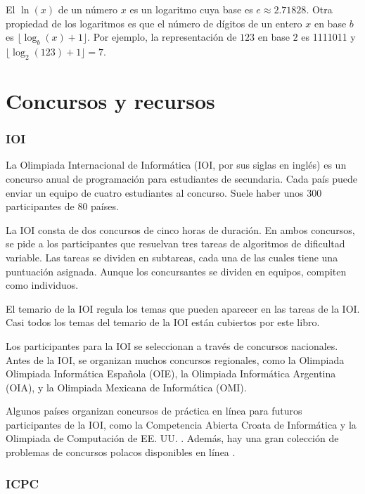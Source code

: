 El  $\ln(x)$ de un número $x$
es un logaritmo cuya base es $e \approx 2.71828$.
Otra propiedad de los logaritmos es que
el número de dígitos de un entero $x$ en base $b$ es
$\lfloor \log_b(x)+1 \rfloor$.
Por ejemplo, la representación de
$123$ en base $2$ es 1111011 y
$\lfloor \log_2(123)+1 \rfloor = 7$.

\section{Concursos y recursos}

\subsubsection{IOI}

La Olimpiada Internacional de Informática (IOI, por sus siglas en inglés)
es un concurso anual de programación para
estudiantes de secundaria.
Cada país puede enviar un equipo de
cuatro estudiantes al concurso.
Suele haber unos 300 participantes
de 80 países.

La IOI consta de dos concursos de cinco horas de duración.
En ambos concursos, se pide a los participantes que
resuelvan tres tareas de algoritmos de dificultad variable.
Las tareas se dividen en subtareas,
cada una de las cuales tiene una puntuación asignada.
Aunque los concursantes se dividen en equipos,
compiten como individuos.

El temario de la IOI \cite{iois} regula los temas
que pueden aparecer en las tareas de la IOI.
Casi todos los temas del temario de la IOI
están cubiertos por este libro.

Los participantes para la IOI se seleccionan a través de
concursos nacionales.
Antes de la IOI, se organizan muchos concursos regionales,
como la Olimpiada Olimpiada Informática Española (OIE),
la Olimpiada Informática Argentina (OIA),
y la Olimpiada Mexicana de Informática (OMI).

Algunos países organizan concursos de práctica en línea
para futuros participantes de la IOI,
como la Competencia Abierta Croata de Informática \cite{coci}
y la Olimpiada de Computación de EE. UU. \cite{usaco}.
Además, hay una gran colección de problemas de concursos polacos
disponibles en línea \cite{main}.

\subsubsection{ICPC}

